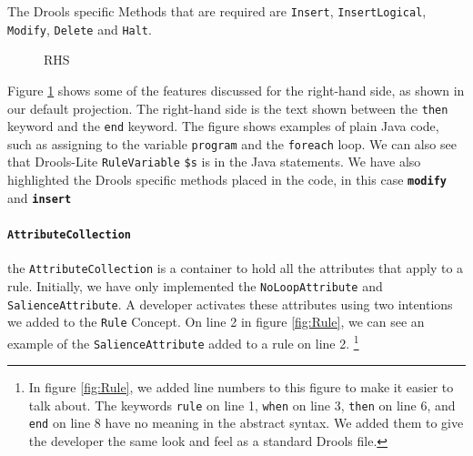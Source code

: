 The Drools specific Methods that are required are \texttt{Insert}, \texttt{InsertLogical}, \texttt{Modify}, \texttt{Delete} and \texttt{Halt}.

\begin{figure}[!h]
    \centering
    \caption{RHS}
    \label{fig:RHS}
\end{figure}

Figure \ref{fig:RHS} shows some of the features discussed for the right-hand side, as shown in our default projection.
The right-hand side is the text shown between the \texttt{then} keyword and the \texttt{end} keyword.
The figure shows examples of plain Java code, such as assigning to the variable \texttt{program} and the \texttt{foreach} loop.
We can also see that Drools-Lite \texttt{RuleVariable} \texttt{\$s} is in the Java statements.
We have also highlighted the Drools specific methods placed in the code, in this case \texttt{\textbf{modify}} and \texttt{\textbf{insert}}   

\paragraph{\texttt{AttributeCollection}} the \texttt{AttributeCollection} is a container to hold all the attributes that apply to a rule.
Initially, we have only implemented the \texttt{NoLoopAttribute} and \texttt{SalienceAttribute}.
A developer activates these attributes using two intentions we added to the \texttt{Rule} Concept.
On line 2 in figure \ref{fig:Rule}, we can see an example of the \texttt{SalienceAttribute} added to a rule on line 2.
\footnote{In figure \ref{fig:Rule}, we added line numbers to this figure to make it easier to talk about.
The keywords \texttt{rule} on line 1, \texttt{when} on line 3, \texttt{then} on line 6, and \texttt{end} on line 8 have no meaning in the abstract syntax.
We added them to give the developer the same look and feel as a standard Drools file.}

